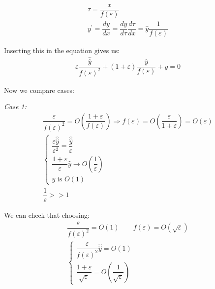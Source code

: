\begin{equation*}
  \begin{gathered}
    \tau = \dfrac{x}{f(\varepsilon)}\\
    y^{\prime} = \dfrac{dy}{dx} = \dfrac{dy}{d\tau}\dfrac{d\tau}{dx} = \hat{y}\dfrac{1}{f(\varepsilon)}
  \end{gathered}
\end{equation*}\par
\noindent Inserting this in the equation gives us:
\begin{equation*}
  \begin{gathered}
    \varepsilon\dfrac{\hat{\hat{y}}}{f(\varepsilon)^2}+(1+\varepsilon)\dfrac{\hat{y}}{f(\varepsilon)}+y=0
  \end{gathered}
\end{equation*}
\par\bigskip
\noindent Now we compare cases:\par
\textit{Case 1:}
\begin{equation*}
  \begin{gathered}
    \dfrac{\varepsilon}{f(\varepsilon)^2} = O\left(\dfrac{1+\varepsilon}{f(\varepsilon)}\right)\Rightarrow f(\varepsilon) = O\left(\dfrac{\varepsilon}{1+\varepsilon}\right) = O(\varepsilon)\\
    \begin{cases*}
      \dfrac{\varepsilon\hat{\hat{y}}}{\varepsilon^2} = \dfrac{\hat{\hat{y}}}{\varepsilon}\\
      \dfrac{1+\varepsilon}{\varepsilon}\hat{y}\to O\left(\dfrac{1}{\varepsilon}\right)\\
      y\text{ is } O(1)
    \end{cases*}\\
    \dfrac{1}{\varepsilon} >> 1
  \end{gathered}
\end{equation*}
\par\bigskip
\noindent We can check that choosing:
\begin{equation*}
  \begin{gathered}
    \dfrac{\varepsilon}{f(\varepsilon)^2} = O(1)\qquad f(\varepsilon) = O(\sqrt{\varepsilon})\\
    \begin{cases*}
      \dfrac{\varepsilon}{f(\varepsilon)^2}\hat{\hat{y}} = O(1)\\
      \dfrac{1+\varepsilon}{\sqrt{\varepsilon}} = O\left(\dfrac{1}{\sqrt{\varepsilon}}\right)
    \end{cases*}
  \end{gathered}
\end{equation*}\par
